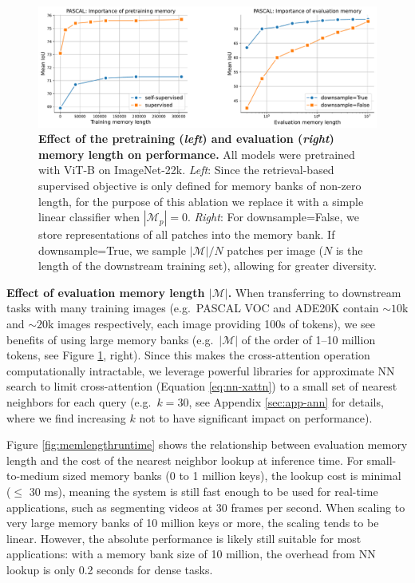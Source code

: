 \documentclass{article}
\newcommand{\eg}{e.g.\ }
\begin{document}
\begin{figure}[h]
  \begin{center}
    \includegraphics[width=\textwidth]{figures/mem_length.pdf}
  \end{center}
\vspace{-0.5em}
\caption{\textbf{Effect of the pretraining (\textit{left}) and evaluation (\textit{right}) memory length on performance.} All models were pretrained with ViT-B on ImageNet-22k. \textit{Left}: Since the retrieval-based supervised objective is only defined for memory banks of non-zero length, for the purpose of this ablation we replace it with a simple linear classifier when $|\mathcal{M}_p|\!=\!0$. \textit{Right}:  For downsample=False, we store representations of all patches into the memory bank. If downsample=True, we sample $|\mathcal{M}|/ N$ patches per image ($N$ is the length of the downstream training set), allowing for greater diversity.
}
\label{fig:memlengthall}
\end{figure}

\textbf{Effect of evaluation memory length $|\mathcal{M}|$. } 
When transferring to downstream tasks with many training images (\eg PASCAL VOC and ADE20K contain $\sim10$k and $\sim20$k   images respectively, each image providing 100s of tokens), we see benefits of using large memory banks (\eg $|\mathcal{M}|$ of the order of 1--10 million tokens, see Figure \ref{fig:memlengthall}, right). Since this makes the cross-attention operation computationally intractable, we leverage powerful libraries for approximate NN search \cite{johnson2019billion, guo2020accelerating} to limit cross-attention (Equation \ref{eq:nn-xattn}) to a small set of nearest neighbors for each query (\eg $k = 30$, see Appendix \ref{sec:app-ann} for details, where we find increasing $k$ not to have significant impact on performance).

Figure \ref{fig:memlengthruntime} shows the relationship between evaluation memory length and the cost of the nearest neighbor lookup at inference time. For small-to-medium sized memory banks (0 to 1 million keys), the lookup cost is minimal (\(\leq\) 30 ms), meaning the system is still fast enough to be used for real-time applications, such as segmenting videos at 30 frames per second. When scaling to very large memory banks of 10 million keys or more, the scaling tends to be linear.
However, the absolute performance is likely still suitable for most applications: with a memory bank size of 10 million, the overhead from NN lookup is only 0.2 seconds for dense tasks.
\end{document}
